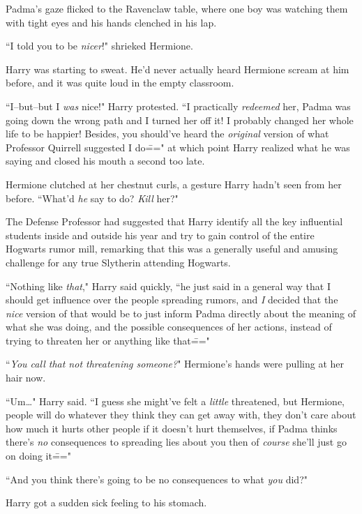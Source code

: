 Padma's gaze flicked to the Ravenclaw table, where one boy was watching them with tight eyes and his hands clenched in his lap.


``I told you to be \emph{nicer}!" shrieked Hermione.

Harry was starting to sweat. He'd never actually heard Hermione scream at him before, and it was quite loud in the empty classroom.

``I\---but\---but I \emph{was} nice!" Harry protested. ``I practically \emph{redeemed} her, Padma was going down the wrong path and I turned her off it! I probably changed her whole life to be happier! Besides, you should've heard the \emph{original} version of what Professor Quirrell suggested I do\===" at which point Harry realized what he was saying and closed his mouth a second too late.

Hermione clutched at her chestnut curls, a gesture Harry hadn't seen from her before. ``What'd \emph{he} say to do? \emph{Kill} her?"

The Defense Professor had suggested that Harry identify all the key influential students inside and outside his year and try to gain control of the entire Hogwarts rumor mill, remarking that this was a generally useful and amusing challenge for any true Slytherin attending Hogwarts.

``Nothing like \emph{that}," Harry said quickly, ``he just said in a general way that I should get influence over the people spreading rumors, and \emph{I} decided that the \emph{nice} version of that would be to just inform Padma directly about the meaning of what she was doing, and the possible consequences of her actions, instead of trying to threaten her or anything like that\==="

``\emph{You call that not threatening someone?}" Hermione's hands were pulling at her hair now.

``Um{\ldots}" Harry said. ``I guess she might've felt a \emph{little} threatened, but Hermione, people will do whatever they think they can get away with, they don't care about how much it hurts other people if it doesn't hurt themselves, if Padma thinks there's \emph{no} consequences to spreading lies about you then of \emph{course} she'll just go on doing it\==="

``And you think there's going to be no consequences to what \emph{you} did?"

Harry got a sudden sick feeling to his stomach.

